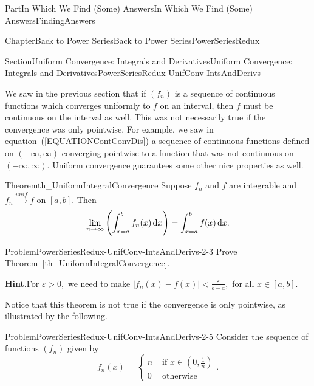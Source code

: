\documentclass[oneside,10pt,]{book}
\newcommand{\blocktitlefont}{\relax}
\newcommand{\xreffont}{\relax}
\numberwithin{equation}{part}
\newcommand{\dx}[1]{\,{\rm d}#1}
\def\limit#1#2#3{{\displaystyle\lim_{#1\rightarrow #2}#3}}
\newcommand{\eps}{\varepsilon}
\newcommand{\unif}{\stackrel{unif}{\longrightarrow}}
\newcommand{\lt}{<}
\newcommand{\amp}{&}
\begin{document}
\begin{partptx}{Part}{In Which We Find (Some) Answers}{}{In Which We Find (Some) Answers}{}{}{FindingAnswers}
\begin{chapterptx}{Chapter}{Back to Power Series}{}{Back to Power Series}{}{}{PowerSeriesRedux}
\typeout{************************************************}
%
\begin{sectionptx}{Section}{Uniform Convergence: Integrals and Derivatives}{}{Uniform Convergence: Integrals and Derivatives}{}{}{PowerSeriesRedux-UnifConv-IntsAndDerivs}
\begin{introduction}{}%
We saw in the previous section that if \(\left(f_n\right)\) is a sequence of continuous functions which converges uniformly to \(f\) on an interval, then \(f\) must be continuous on the interval as well.  This was not necessarily true if the convergence was only pointwise. For example, we saw in \hyperref[EQUATIONContConvDis]{equation~({\xreffont\ref{EQUATIONContConvDis}})} a sequence of continuous functions defined on \((-\infty,\infty)\) converging pointwise to a function that was not continuous on \((-\infty,\infty)\).  Uniform convergence guarantees some other nice properties as well.%
\begin{theorem}{Theorem}{}{}{th_UniformIntegralConvergence}%
%
Suppose \(f_n\) and \(f\) are integrable and \(f_n\unif f\) on \([a,b]\).  Then%
\begin{equation*}
\limit{n}{\infty}{\left(\int_{x=a}^b f_n(x)\dx{
x}\right)}=\int_{x=a}^bf(x)\dx{x}\text{.}
\end{equation*}
%
\end{theorem}
\begin{problem}{Problem}{}{PowerSeriesRedux-UnifConv-IntsAndDerivs-2-3}%
Prove \hyperref[th_UniformIntegralConvergence]{Theorem~{\xreffont\ref{th_UniformIntegralConvergence}}}.%
\par\smallskip%
\noindent\textbf{\blocktitlefont Hint}.\hypertarget{PowerSeriesRedux-UnifConv-IntsAndDerivs-2-3-3}{}\quad{}For \(\eps>0,\) we need to make \(|f_n(x)-f(x)|\lt
\frac{\eps}{b-a},\) for all \(x\in[a,b]\).%
\end{problem}
Notice that this theorem is not true if the convergence is only pointwise, as illustrated by the following.%
\begin{problem}{Problem}{}{PowerSeriesRedux-UnifConv-IntsAndDerivs-2-5}%
Consider the sequence of functions \(\left(f_n\right)\) given by%
\begin{equation*}
f_n(x)= \begin{cases}n\amp \text{ if } x\in\left(0,\frac{1}{n}\right)\\ 0\amp \text{ otherwise } \end{cases} \text{.}
\end{equation*}
%
\begin{enumerate}[label={(\alph*)}]

\end{enumerate}
\end{problem}
\end{introduction}
\end{sectionptx}
\end{chapterptx}
\end{partptx}
\end{document}
